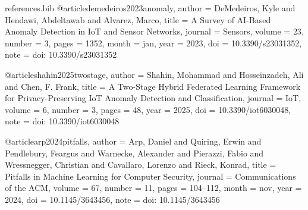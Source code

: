 \begin{filecontents*}[overwrite]{references.bib}
@article{demedeiros2023anomaly,
  author  = {DeMedeiros, Kyle and Hendawi, Abdeltawab and Alvarez, Marco},
  title   = {A Survey of {AI}-Based Anomaly Detection in {IoT} and Sensor Networks},
  journal = {Sensors},
  volume  = {23},
  number  = {3},
  pages   = {1352},
  month   = jan,
  year    = {2023},
  doi     = {10.3390/s23031352},
  note    = {doi: 10.3390/s23031352}
}

@article{shahin2025twostage,
  author  = {Shahin, Mohammad and Hosseinzadeh, Ali and Chen, F. Frank},
  title   = {A Two-Stage Hybrid Federated Learning Framework for Privacy-Preserving {IoT} Anomaly Detection and Classification},
  journal = {IoT},
  volume  = {6},
  number  = {3},
  pages   = {48},
  year    = {2025},
  doi     = {10.3390/iot6030048},
  note    = {doi: 10.3390/iot6030048}
}

@article{arp2024pitfalls,
  author  = {Arp, Daniel and Quiring, Erwin and Pendlebury, Feargus and Warnecke, Alexander and Pierazzi, Fabio and Wressnegger, Christian and Cavallaro, Lorenzo and Rieck, Konrad},
  title   = {Pitfalls in Machine Learning for Computer Security},
  journal = {Communications of the ACM},
  volume  = {67},
  number  = {11},
  pages   = {104--112},
  month   = nov,
  year    = {2024},
  doi     = {10.1145/3643456},
  note    = {doi: 10.1145/3643456}
}
\end{filecontents*}

\documentclass[journal,onecolumn]{IEEEtran}
\usepackage{cite}
\usepackage{amsmath,amssymb,amsfonts}
\usepackage{graphicx}
\usepackage{textcomp}
\usepackage{float}
\usepackage{array}
\usepackage{iftex}
\ifPDFTeX
  \usepackage[T1]{fontenc}
  \usepackage[utf8]{inputenc}
  \usepackage{newtxtext,newtxmath}
\else
  \usepackage{fontspec}
  \setmainfont{TeX Gyre Termes}[
    Extension = .otf,
    UprightFont = *-regular,
    BoldFont = *-bold,
    ItalicFont = *-italic,
    BoldItalicFont = *-bolditalic
  ]
\fi
\usepackage{tikz}
\usetikzlibrary{arrows.meta,positioning,fit,shapes.geometric,calc,backgrounds}


